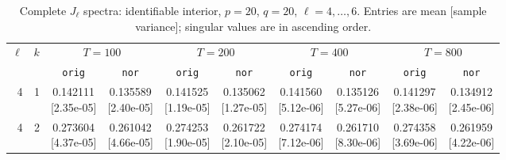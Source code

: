 \documentclass[12pt,letterpaper]{article}
\def\spacingset#1{\renewcommand{\baselinestretch}{#1}\small\normalsize}
\theoremstyle{plain}
\theoremstyle{definition}
\begin{document}
\clearpage
\begin{table}[p]
\begingroup
\spacingset{1.0}
\small\centering
\caption{Complete $J_\ell$ spectra: identifiable interior, $p=20$, $q=20$, $\ell=4,\ldots,6$. Entries are mean [sample variance]; singular values are in ascending order.}
\label{s23:lambda:alltab:spectra:p20q20interior:4-6}
\footnotesize
\setlength{\tabcolsep}{2.2pt}
\renewcommand{\arraystretch}{1.03}
\begin{adjustbox}{max width=\linewidth}
\begin{tabular}{@{}rr*{8}{c}@{}}
\toprule
$\ell$ & $k$ & \multicolumn{2}{c}{$T=100$} & \multicolumn{2}{c}{$T=200$} & \multicolumn{2}{c}{$T=400$} & \multicolumn{2}{c}{$T=800$}\\
\cmidrule(lr){3-4}\cmidrule(lr){5-6}\cmidrule(lr){7-8}\cmidrule(lr){9-10}
 &  & \texttt{orig} & \texttt{nor} & \texttt{orig} & \texttt{nor} & \texttt{orig} & \texttt{nor} & \texttt{orig} & \texttt{nor}\\
\midrule
4 & 1 & \shortstack{0.142111\\[-1pt]{\scriptsize[2.35e-05]}} & \shortstack{0.135589\\[-1pt]{\scriptsize[2.40e-05]}} & \shortstack{0.141525\\[-1pt]{\scriptsize[1.19e-05]}} & \shortstack{0.135062\\[-1pt]{\scriptsize[1.27e-05]}} & \shortstack{0.141560\\[-1pt]{\scriptsize[5.12e-06]}} & \shortstack{0.135126\\[-1pt]{\scriptsize[5.27e-06]}} & \shortstack{0.141297\\[-1pt]{\scriptsize[2.38e-06]}} & \shortstack{0.134912\\[-1pt]{\scriptsize[2.45e-06]}}\\
4 & 2 & \shortstack{0.273604\\[-1pt]{\scriptsize[4.37e-05]}} & \shortstack{0.261042\\[-1pt]{\scriptsize[4.66e-05]}} & \shortstack{0.274253\\[-1pt]{\scriptsize[1.90e-05]}} & \shortstack{0.261722\\[-1pt]{\scriptsize[2.10e-05]}} & \shortstack{0.274174\\[-1pt]{\scriptsize[7.12e-06]}} & \shortstack{0.261710\\[-1pt]{\scriptsize[8.30e-06]}} & \shortstack{0.274358\\[-1pt]{\scriptsize[3.69e-06]}} & \shortstack{0.261959\\[-1pt]{\scriptsize[4.22e-06]}}\\

\end{tabular}
\end{adjustbox}
\end{table}
\end{document}
